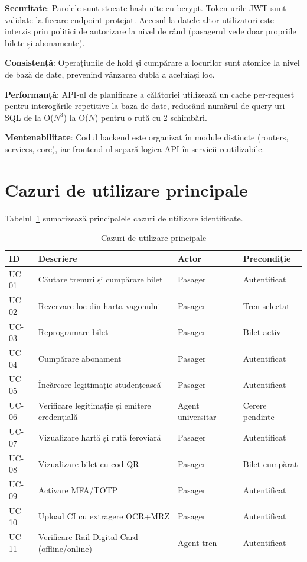 \documentclass[12pt,a4paper]{report}
\begin{document}
\textbf{Securitate}: Parolele sunt stocate hash-uite cu bcrypt. Token-urile JWT sunt validate la fiecare endpoint protejat. Accesul la datele altor utilizatori este interzis prin politici de autorizare la nivel de rând (pasagerul vede doar propriile bilete și abonamente).

\textbf{Consistență}: Operațiunile de hold și cumpărare a locurilor sunt atomice la nivel de bază de date, prevenind vânzarea dublă a aceluiași loc.

\textbf{Performanță}: API-ul de planificare a călătoriei utilizează un cache per-request pentru interogările repetitive la baza de date, reducând numărul de query-uri SQL de la O($N^3$) la O($N$) pentru o rută cu 2 schimbări.

\textbf{Mentenabilitate}: Codul backend este organizat în module distincte (routers, services, core), iar frontend-ul separă logica API în servicii reutilizabile.

\section{Cazuri de utilizare principale}

Tabelul~\ref{tab:usecases} sumarizează principalele cazuri de utilizare identificate.

\begin{table}[ht]\small\linespread{1}
\caption{Cazuri de utilizare principale}
\label{tab:usecases}
\begin{tabular}{l p{5cm} l p{4cm}}
\textbf{ID} & \textbf{Descriere} & \textbf{Actor} & \textbf{Precondiție} \\\hline
UC-01 & Căutare trenuri și cumpărare bilet & Pasager & Autentificat \\
UC-02 & Rezervare loc din harta vagonului & Pasager & Tren selectat \\
UC-03 & Reprogramare bilet & Pasager & Bilet activ \\
UC-04 & Cumpărare abonament & Pasager & Autentificat \\
UC-05 & Încărcare legitimație studențească & Pasager & Autentificat \\
UC-06 & Verificare legitimație și emitere credențială & Agent universitar & Cerere pendinte \\
UC-07 & Vizualizare hartă și rută feroviară & Pasager & Autentificat \\
UC-08 & Vizualizare bilet cu cod QR & Pasager & Bilet cumpărat \\
UC-09 & Activare MFA/TOTP & Pasager & Autentificat \\
UC-10 & Upload CI cu extragere OCR+MRZ & Pasager & Autentificat \\
UC-11 & Verificare Rail Digital Card (offline/online) & Agent tren & Autentificat \\
\hline
\end{tabular}
\end{table}
\end{document}
